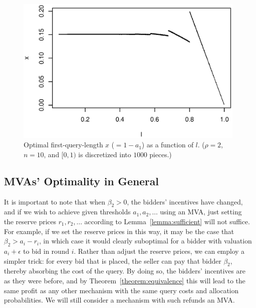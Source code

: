 \begin{figure}
    \includegraphics[trim=0mm 5mm 5mm 15mm, clip, width=\linewidth]{figures/10000-500-2-1-10}
    \caption{Optimal first-query-length $x$ ($=1-a_1$) as a function of
      $l$. ($\rho=2$, $n=10$, and $[0,1)$ is discretized into $1000$ pieces.)}
    \label{fig:x-l}
\end{figure}


\subsection{MVAs' Optimality in General}

It is important to note that when $\beta_2 > 0$, the bidders' incentives
have changed, and if we wish to achieve given  thresholds $a_1, a_2,
\ldots$ using an MVA, just setting the reserve prices $r_1, r_2, \ldots$
according to Lemma~\ref{lemma:sufficient} will not suffice.  For example,
if we set the reserve prices in this way,
it may be the case that $\beta_2 > a_i - r_i$, in which case it would clearly suboptimal for a bidder with valuation $a_i+\epsilon$ to bid in
round $i$.
Rather than
adjust the reserve prices, we can employ a simpler trick: for every bid
that is placed, the seller can pay that bidder $\beta_2$, thereby absorbing
the cost of the query.  By doing so, the bidders' incentives are as they
were before, 
and by
Theorem~\ref{theorem:equivalence} this will lead to the same profit as any
other mechanism with the same query costs and allocation probabilities.
We will still consider a mechanism with such refunds an MVA.



